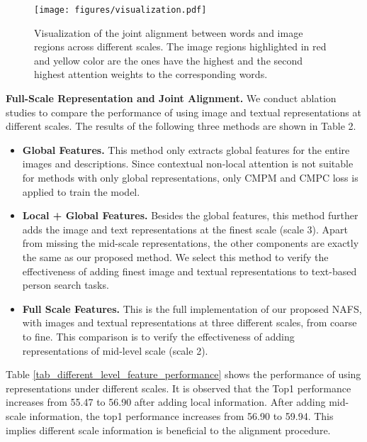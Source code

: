 \documentclass[final]{cvpr}
\begin{document}
\begin{figure*}
    \centering
    \texttt{[image: figures/visualization.pdf]}
    \caption{Visualization of the joint alignment between words and image regions across different scales. The image regions highlighted in red and yellow color are the ones have the highest and the second highest attention weights to the corresponding words.
    }
    \label{fig_visualization}
\end{figure*}



\textbf{Full-Scale Representation and Joint Alignment.} We conduct ablation studies to compare the performance of using image and textual representations at different scales. The results of the following three methods are shown in Table 2.
\begin{itemize}
    \item \textbf{Global Features.} This method only extracts global features for the entire images and descriptions. Since contextual non-local attention is not suitable for methods with only global representations, only CMPM and CMPC loss is applied to train the model. 
    \vspace{-4pt}
    \item \textbf{Local + Global Features.} Besides the global features, this method further adds the image and text representations at the finest scale (scale 3). 
    Apart from missing the mid-scale representations, the other components are exactly the same as our proposed method. We select this method to verify the effectiveness of adding finest image and textual representations to text-based person search tasks. 
    \vspace{-4pt}
    \item \textbf{Full Scale Features.} This is the full implementation of our proposed NAFS, with images and textual representations at three different scales, from coarse to fine. This comparison is to verify the effectiveness of adding representations of mid-level scale (scale 2).
\end{itemize}
Table \ref{tab_different_level_feature_performance} shows the performance of using representations under different scales. It is observed that the Top1 performance increases from 55.47 to 56.90 after adding local information. After adding mid-scale information, the top1 performance increases from 56.90 to 59.94. This implies different scale information is beneficial to the alignment procedure.
\end{document}
